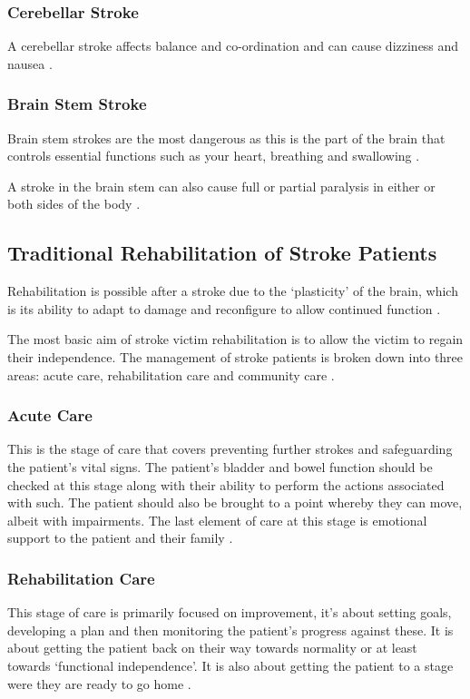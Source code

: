 \documentclass[journal]{IEEEtran}
\begin{document}
\subsubsection{Cerebellar Stroke}
A cerebellar stroke affects balance and co-ordination and can cause dizziness 
and nausea \cite{NSA, TheBrain}.

\subsubsection{Brain Stem Stroke}
Brain stem strokes are the most dangerous as this is the part of the brain that 
controls essential functions such as your heart, breathing and swallowing \cite{NSA,TheBrain}.

A stroke in the brain stem can also cause full or partial paralysis in either or 
both sides of the body \cite{NSA}.

\subsection{Traditional Rehabilitation of Stroke Patients}
Rehabilitation is possible after a stroke due to the `plasticity' of the brain, which is 
its ability to adapt to damage and reconfigure to allow continued function \cite{TheBrain}.

The most basic aim of stroke victim rehabilitation is to allow the victim to regain 
their independence. The management of stroke patients is broken down into three 
areas: acute care, rehabilitation care and community care \cite{Physio}.

\subsubsection{Acute Care}
This is the stage of care that covers preventing further strokes and safeguarding 
the patient's vital signs. The patient's bladder and bowel 
function should be checked at this stage along with their ability to perform the 
actions associated with such. The patient should also be brought to a point 
whereby they can move, albeit with impairments. The last element of care at 
this stage is emotional support to the patient and their family \cite{Physio}.

\subsubsection{Rehabilitation Care}
This stage of care is primarily focused on improvement, it's about setting goals, developing a plan 
and then monitoring the patient's progress against these. It is about getting the patient 
back on their way towards normality or at least towards `functional independence'. It is 
also about getting the patient to a stage were they are ready to go home \cite{Physio}.
\end{document}
